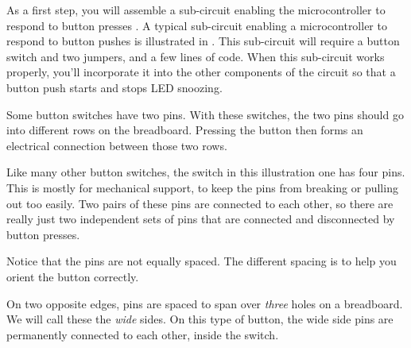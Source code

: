 As a first step, you will assemble a sub-circuit enabling the microcontroller to respond to button presses
. A typical sub-circuit enabling a microcontroller to respond to button pushes is illustrated in . 
This sub-circuit will require a button switch and two jumpers, and a few lines of code. 
When this sub-circuit works properly, you'll incorporate it into the other components of the circuit so that a button push starts and stops LED snoozing. 

Some button switches have two pins. 
With these switches, the two pins should go into different rows on the breadboard.
Pressing the button then forms an electrical connection between those two rows.

Like many other button switches, the switch in this illustration one has four pins. 
This is mostly for mechanical support, to keep the pins from breaking or pulling out too easily.
Two pairs of these pins are connected to each other, so there are really just two independent sets of pins that are connected and disconnected by button presses.

Notice that the pins are not equally spaced. 
The different spacing is to help you orient the button correctly.
 
On two opposite edges, pins are spaced to span over \emph{three} holes on a breadboard. 
We will call these the \emph{wide} sides.
On this type of button, the wide side pins are permanently connected to each other, inside the switch. 

